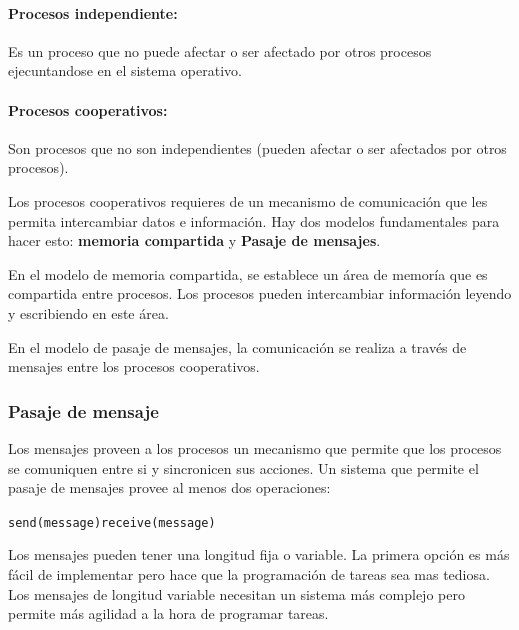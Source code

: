 \paragraph{Procesos independiente:} Es un proceso que no puede afectar o ser afectado por otros procesos ejecuntandose en el sistema operativo.

\paragraph{Procesos cooperativos:} Son procesos que no son independientes (pueden afectar o ser afectados por otros procesos).

Los procesos cooperativos requieres de un mecanismo de comunicación que les permita intercambiar datos e información. Hay dos modelos fundamentales para hacer esto: \textbf{memoria compartida} y \textbf{Pasaje de mensajes}.

En el modelo de memoria compartida, se establece un área de memoría que es compartida entre procesos. Los procesos pueden intercambiar información leyendo y escribiendo en este área.

En el modelo de pasaje de mensajes, la comunicación se realiza a través de mensajes entre los procesos cooperativos.

\subsubsection{Pasaje de mensaje}
Los mensajes proveen a los procesos un mecanismo que permite que los procesos se comuniquen entre si y sincronicen sus acciones. Un sistema que permite el pasaje de mensajes provee al menos dos operaciones:
\begin{center}
	\texttt{send(message)}\hspace*{1cm}\texttt{receive(message)}
\end{center}

Los mensajes pueden tener una longitud fija o variable. La primera opción es más fácil de implementar pero hace que la programación de tareas sea mas tediosa. Los mensajes de longitud variable necesitan un sistema más complejo pero permite más agilidad a la hora de programar tareas.

